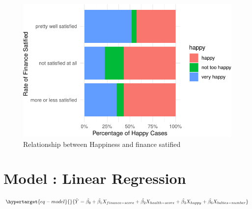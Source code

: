 \documentclass[
  letterpaper,
  DIV=11,
  numbers=noendperiod]{scrartcl}
\begin{document}
\begin{figure}

{\centering \includegraphics{paper_files/figure-pdf/fig-six-1.pdf}

}

\caption{\label{fig-six}Relationship between Happiness and finance
satified}

\end{figure}

\hypertarget{model-linear-regression}{%
\section{Model : Linear Regression}\label{model-linear-regression}}

\begin{equation}\protect\hypertarget{eq-model}{}{
\hat{Y}=\hat{\beta_0} + \hat{\beta_1}X_{finance-score} + \hat{\beta_2}X_{health-score} + \hat{\beta_3}X_{happy} + 
\hat{\beta_6}X_{babies-number} 
}\label{eq-model}\end{equation}
\end{document}
